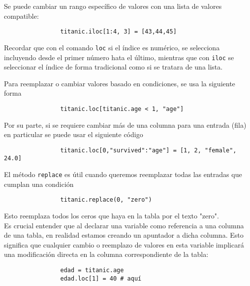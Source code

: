             \noindent Se puede cambiar un rango específico de valores con una lista de valores compatible:

            \begin{verbatim}
                titanic.iloc[1:4, 3] = [43,44,45]
            \end{verbatim}

            \noindent Recordar que con el comando \texttt{loc} si el índice es numérico, se selecciona incluyendo desde el primer número hata el último, mientras que con \texttt{iloc} se seleccionar el índice de forma tradicional como si se tratara de una lista.

            \noindent Para reemplazar o cambiar valores basado en condiciones, se usa la siguiente forma
            \begin{verbatim}
                titanic.loc[titanic.age < 1, "age"]
            \end{verbatim}

            \noindent Por su parte, si se requiere cambiar más de una columna para una entrada (fila) en particular se puede usar el siguiente código

            \begin{verbatim}
                titanic.loc[0,"survived":"age"] = [1, 2, "female", 24.0]
            \end{verbatim}

            \noindent El método \texttt{replace} es útil cuando queremos reemplazar todas las entradas que cumplan una condición

            \begin{verbatim}
                titanic.replace(0, "zero")
            \end{verbatim}

            \noindent Esto reemplaza todos los ceros que haya en la tabla por el texto "zero". \\

            \noindent Es crucial entender que al declarar una variable como referencia a una columna de una tabla, en realidad estamos creando un apuntador a dicha columna. Esto significa que cualquier cambio o reemplazo de valores en esta variable implicará una modificación directa en la columna correspondiente de la tabla:

            \begin{verbatim}
                edad = titanic.age
                edad.loc[1] = 40 # aquí
            \end{verbatim}


